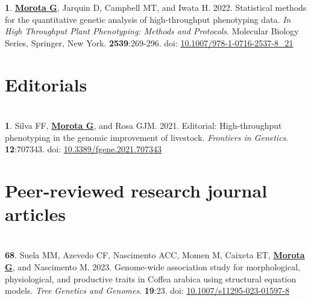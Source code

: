 \documentclass[margin,line,10pt]{res}
\newenvironment{list1}{
  \begin{list}{\ding{113}}{%
      \setlength{\itemsep}{0in}
      \setlength{\parsep}{0in} \setlength{\parskip}{0in}
      \setlength{\topsep}{0in} \setlength{\partopsep}{0in} 
      \setlength{\leftmargin}{0.17in}}}{\end{list}}
\begin{document}
\begin{resume}
\begin{list1}
\item  [{\bf 1}.] \textbf{\underline{Morota G}}, Jarquin D, Campbell MT, and Iwata H. 2022. Statistical methods for the quantitative genetic analysis of high-throughput phenotyping data. \emph{In High Throughput Plant Phenotyping: Methods and Protocols}. Molecular Biology Series, Springer, New York. \textbf{2539}:269-296. doi: \textcolor{blue}{\href{https://doi.org/10.1007/978-1-0716-2537-8_21}{10.1007/978-1-0716-2537-8\_21}}

\end{list1}


\vspace{0.5cm}
\section{\sc Editorials}
\vspace{1.0cm}

\section{}
\begin{list1}
\item [{\bf 1}.]  Silva FF, {\bf \underline{Morota G}}, and Rosa GJM. 2021. Editorial: High-throughput phenotyping in the genomic improvement of livestock. \emph{Frontiers in Genetics}. \textbf{12}:707343. doi: \textcolor{blue}{\href{https://doi.org/10.3389/fgene.2021.707343}{10.3389/fgene.2021.707343}}
\end{list1}



\section{\sc Peer-reviewed research journal articles}

\vspace{1.5cm}


\section{}
\begin{list1}

  \item  [{\bf 68}.] Suela MM, Azevedo CF, Nascimento ACC, Momen M, Caixeta ET, \textbf{\underline{Morota G}}, and Nascimento M. 2023. Genome-wide association study for morphological, physiological, and productive traits in Coffea arabica using structural equation models. \emph{Tree Genetics and Genomes}. \textbf{19}:23. doi: \textcolor{blue}{\href{https://doi.org/10.1007/s11295-023-01597-8}{10.1007/s11295-023-01597-8}} 


\end{list1}
\end{resume}
\end{document}
